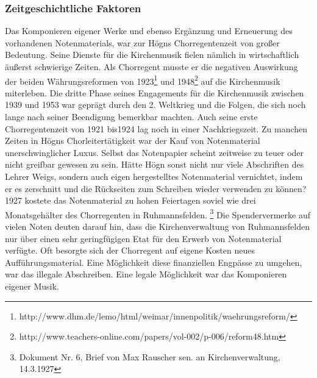\subsubsection{Zeitgeschichtliche Faktoren}

Das Komponieren eigener Werke und
ebenso Ergänzung und Erneuerung des vorhandenen Notenmaterials, war zur
Högns Chorregentenzeit von großer Bedeutung. Seine Dienste für die
Kirchenmusik fielen nämlich in wirtschaftlich äußerst schwierige
Zeiten. Als Chorregent musste er die negativen Auswirkung der beiden
Währungsreformen von 1923\footnote{
http://www.dhm.de/lemo/html/weimar/innenpolitik/waehrungsreform/} und
1948\footnote{
http://www.teachers-online.com/papers/vol-002/p-006/reform48.htm} auf
die Kirchenmusik miterleben. Die dritte Phase seines Engagements für
die Kirchenmusik zwischen 1939 und 1953 war geprägt durch den 2.
Weltkrieg und die Folgen, die sich noch lange nach seiner Beendigung
bemerkbar machten. Auch seine erste Chorregentenzeit von 1921 bis1924
lag noch in einer Nachkriegszeit. Zu manchen Zeiten in Högns
Chorleitertätigkeit war der Kauf von Notenmaterial unerschwinglicher
Luxus. Selbst das Notenpapier scheint zeitweise zu teuer oder nicht
greifbar gewesen zu sein. Hätte Högn sonst nicht nur viele Abschriften
des Lehrer Weigs, sondern auch eigen hergestelltes Notenmaterial
vernichtet, indem er es zerschnitt und die Rückseiten zum Schreiben
wieder verwenden zu können? 1927 kostete das Notenmaterial zu hohen
Feiertagen soviel wie drei Monatsgehälter des Chorregenten in
Ruhmannsfelden. \footnote{Dokument Nr. 6, Brief von Max Rauscher sen.
an Kirchenverwaltung, 14.3.1927} Die Spendervermerke auf vielen Noten
deuten darauf hin, dass die Kirchenverwaltung von Ruhmannsfelden nur
über einen sehr geringfügigen Etat für den Erwerb von Notenmaterial
verfügte. Oft besorgte sich der Chorregent auf eigene Kosten neues
Aufführungsmaterial. Eine Möglichkeit diese finanziellen Engpässe zu
umgehen, war das illegale Abschreiben. Eine legale Möglichkeit war das
Komponieren eigener Musik.
